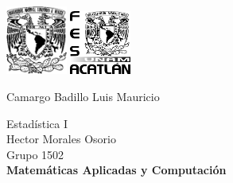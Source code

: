 \begin{titlepage}
    \begin{center}
        \includegraphics[width=0.15\textwidth]{assets/unam.png}
        \hspace{0.6\textwidth}
        \includegraphics[width=0.15\textwidth]{assets/fes.png}

        \vspace*{5cm}
        \LARGE
        \textbf{\titulo}

        \vspace{1cm}
        \large
        Camargo Badillo Luis Mauricio \\
        \vspace{0.5cm}
        \textit{\fecha}

        \vfill

        \vspace{0.5cm}
        Estadística I \\
        Hector Morales Osorio \\
        Grupo 1502 \\
        \textbf{Matemáticas Aplicadas y Computación}\\
    \end{center}
\end{titlepage}
